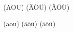 \documentclass{article}
\begin{document}
\MakeUppercase{(aou) (äöü) (ÄÖÜ)}

\MakeLowercase{(aou) (ÄÖÜ) (äöü)}
\end{document}

